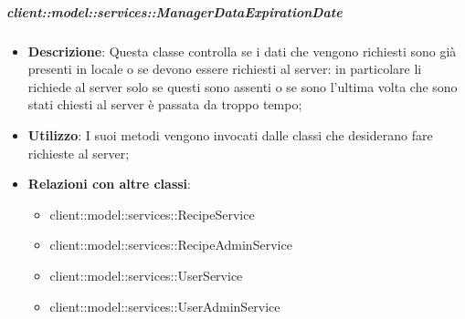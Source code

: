 		\subparagraph{client::model::services::ManagerDataExpirationDate} %
		\label{subp:radarchartcreator}
			\begin{itemize}
				\item \textbf{Descrizione}: Questa classe controlla se i dati che vengono richiesti sono già presenti in locale o se devono essere richiesti al server: in particolare li richiede al server solo se questi sono assenti o se sono l'ultima volta che sono stati chiesti al server è passata da troppo tempo;
				\item \textbf{Utilizzo}: I suoi metodi vengono invocati dalle classi che desiderano fare richieste al server;
				\item \textbf{Relazioni con altre classi}:					
					\begin{itemize}
						\item client::model::services::RecipeService
						\item client::model::services::RecipeAdminService
						\item client::model::services::UserService
						\item client::model::services::UserAdminService
					\end{itemize}
			\end{itemize}

